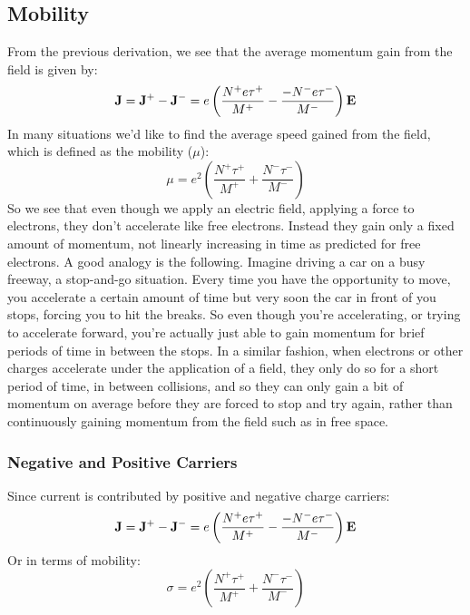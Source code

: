 \subsection{Mobility}
From the previous derivation, we see that the average momentum gain from the field is given by:
    \begin{equation}
        {\bf{J}} = {{\bf{J}}^ + } - {{\bf{J}}^ - } = e\left( {\frac{{{N^ + }e{\tau ^ + }}}{{{M^ + }}} - \frac{{ - {N^ - }e{\tau ^ - }}}{{{M^ - }}}} \right){\bf{E}}
    \end{equation}
In many situations we’d like to find the average speed gained from the field, which is defined as  the mobility ($\mu$):
    \begin{equation}
        \mu  = {e^2}\left( {\frac{{{N^ + }{\tau ^ + }}}{{{M^ + }}} + \frac{{{N^ - }{\tau ^ - }}}{{{M^ - }}}} \right)
    \end{equation}
So we see that even though we apply an electric field, applying a force to electrons, they don't accelerate like free electrons.  Instead they gain only a fixed amount of momentum, not linearly increasing in time as predicted for free electrons.
A good analogy is the following.  Imagine driving a car on a busy freeway, a stop-and-go situation.  Every time you have the opportunity to move, you accelerate a certain amount of time but very soon the car in front of you stops, forcing you to hit the breaks.  So even though you're accelerating, or trying to accelerate forward, you're actually just able to gain momentum for brief periods of time in between the stops.  In a similar fashion, when electrons or other charges accelerate under the application of a field, they only do so for a short period of time, in between collisions, and so they can only gain a bit of  momentum on average before they are forced to stop and try again, rather than continuously gaining momentum from the field such as in free space.
\subsubsection{Negative and Positive Carriers}
Since current is contributed by positive and negative charge carriers:
    \begin{equation}
        {\bf{J}} = {{\bf{J}}^ + } - {{\bf{J}}^ - } = e\left( {\frac{{{N^ + }e{\tau ^ + }}}{{{M^ + }}} - \frac{{ - {N^ - }e{\tau ^ - }}}{{{M^ - }}}} \right){\bf{E}}
    \end{equation}
Or in terms of mobility:
    \begin{equation}
        \sigma  = {e^2}\left( {\frac{{{N^ + }{\tau ^ + }}}{{{M^ + }}} + \frac{{{N^ - }{\tau ^ - }}}{{{M^ - }}}} \right)
    \end{equation}
